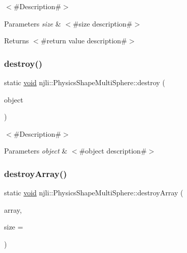$<$\#\+Description\#$>$


\begin{DoxyParams}{Parameters}
{\em size} & $<$\#size description\#$>$\\
\hline
\end{DoxyParams}
\begin{DoxyReturn}{Returns}
$<$\#return value description\#$>$ 
\end{DoxyReturn}
\mbox{\label{classnjli_1_1_physics_shape_multi_sphere_ab662607b3880e2239637469d75955ec3}} 
\subsubsection{\texorpdfstring{destroy()}{destroy()}}
{\footnotesize\ttfamily static \mbox{\hyperlink{_thread_8h_af1e856da2e658414cb2456cb6f7ebc66}{void}} njli\+::\+Physics\+Shape\+Multi\+Sphere\+::destroy (\begin{DoxyParamCaption}\item[{\mbox{\hyperlink{classnjli_1_1_physics_shape_multi_sphere}{Physics\+Shape\+Multi\+Sphere}} $\ast$}]{object }\end{DoxyParamCaption})\hspace{0.3cm}{\ttfamily [static]}}

$<$\#\+Description\#$>$


\begin{DoxyParams}{Parameters}
{\em object} & $<$\#object description\#$>$ \\
\hline
\end{DoxyParams}
\mbox{\label{classnjli_1_1_physics_shape_multi_sphere_a67cf27c9dcf4d1dd68ea1c603eb054dd}} 
\subsubsection{\texorpdfstring{destroy\+Array()}{destroyArray()}}
{\footnotesize\ttfamily static \mbox{\hyperlink{_thread_8h_af1e856da2e658414cb2456cb6f7ebc66}{void}} njli\+::\+Physics\+Shape\+Multi\+Sphere\+::destroy\+Array (\begin{DoxyParamCaption}\item[{\mbox{\hyperlink{classnjli_1_1_physics_shape_multi_sphere}{Physics\+Shape\+Multi\+Sphere}} $\ast$$\ast$}]{array,  }\item[{const \mbox{\hyperlink{_util_8h_a10e94b422ef0c20dcdec20d31a1f5049}{u32}}}]{size = {} }\end{DoxyParamCaption})\hspace{0.3cm}{\ttfamily [static]}}

